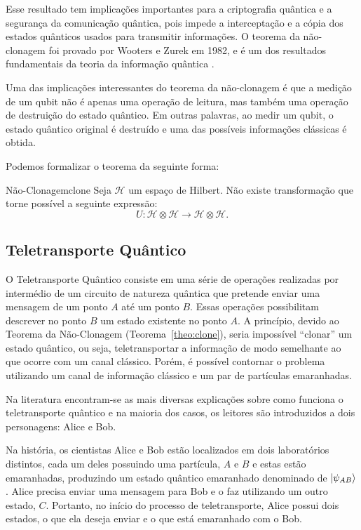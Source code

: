 Esse resultado tem implicações importantes para a criptografia quântica e a segurança da comunicação quântica, pois impede a interceptação e a cópia dos estados quânticos usados para transmitir informações. O teorema da não-clonagem foi provado por Wooters e Zurek em 1982, e é um dos resultados fundamentais da teoria da informação quântica \cite{clone}.

Uma das implicações interessantes do teorema da não-clonagem é que a medição de um qubit não é apenas uma operação de leitura, mas também uma operação de destruição do estado quântico. Em outras palavras, ao medir um qubit, o estado quântico original é destruído e uma das possíveis informações clássicas é obtida. 

Podemos formalizar o teorema da seguinte forma:

\begin{theo}{Não-Clonagem}{clone}
  Seja $\mathcal{H}$ um espaço de Hilbert. Não existe transformação que torne possível a seguinte expressão:
  \begin{equation}
    U: \mathcal{H} \otimes \mathcal{H} \longrightarrow \mathcal{H} \otimes \mathcal{H}.
  \end{equation}
\end{theo}

\subsection{Teletransporte Quântico}\label{sec:teletransporteteoria}

O Teletransporte Quântico consiste em uma série de operações realizadas por intermédio de um circuito de natureza quântica que pretende enviar uma mensagem de um ponto \(A\) até um ponto \(B\). Essas operações possibilitam descrever no ponto \(B\) um estado existente no ponto \(A\). A princípio, devido ao Teorema da Não-Clonagem (Teorema~\ref{theo:clone}), seria impossível ``clonar'' um estado quântico, ou seja, teletransportar a informação de modo semelhante ao que ocorre com um canal clássico. Porém, é possível contornar o problema utilizando um canal de informação clássico e um par de partículas emaranhadas.

Na literatura encontram-se as mais diversas explicações sobre como funciona o teletransporte quântico \cites{bennet}{experimentalqt}{zeilinger}{brassard1996teleportation}{materialdidaticomecquantica} e na maioria dos casos, os leitores são introduzidos a dois personagens: Alice e Bob.

Na história, os cientistas Alice e Bob estão localizados em dois laboratórios distintos, cada um deles possuindo uma partícula, $A$ e $B$ e estas estão emaranhadas, produzindo um estado quântico emaranhado denominado de $\ket{\psi_{AB}}$. Alice precisa enviar uma mensagem para Bob e o faz utilizando um outro estado, $C$. Portanto, no início do processo de teletransporte, Alice possui dois estados, o que ela deseja enviar e o que está emaranhado com o Bob.

